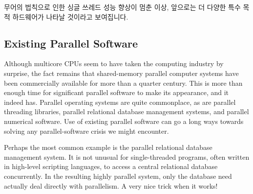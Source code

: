 무어의 법칙으로 인한 싱글 쓰레드 성능 향상이 멈춘 이상, 앞으로는 더 다양한 특수
목적 하드웨어가 나타날 것이라고 보여집니다.

\iffalse
Unlike the server and PC arena, smartphones have long used a wide
variety of hardware accelerators.
These hardware accelerators are often used for media decoding,
so much so that a high-end MP3 player might be able to play audio
for several minutes---with its CPU fully powered off the entire time.
The purpose of these accelerators is to improve energy efficiency
and thus extend battery life: special purpose hardware can often
compute more efficiently than can a general-purpose CPU.
This is another example of the principle called out in
Section~\ref{sec:intro:Generality}: Generality is almost never free.

Nevertheless, given the end of Moore's-Law-induced single-threaded
performance increases, it seems safe to predict that there will
be an increasing variety of special-purpose hardware going forward.
\fi

\subsection{Existing Parallel Software}
\label{sec:cpu:Existing Parallel Software}

Although multicore CPUs seem to have taken the computing industry
by surprise, the fact remains that shared-memory parallel computer
systems have been commercially available for more than a quarter
century.
This is more than enough time for significant parallel software
to make its appearance, and it indeed has.
Parallel operating systems are quite commonplace, as are parallel
threading libraries, parallel relational database management systems, 
and parallel numerical software.
Use of existing parallel software can go a long ways towards solving any
parallel-software crisis we might encounter.

Perhaps the most common example is the parallel relational database
management system.
It is not unusual for single-threaded programs, often written in
high-level scripting languages, to access a central relational
database concurrently.
In the resulting highly parallel system, only the database need actually
deal directly with parallelism.
A very nice trick when it works!
